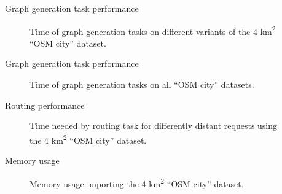\documentclass[xcolor={x11names}]{beamer}
\newenvironment{figcenter}
{%
	\parskip=0pt%
	\par%
	\nopagebreak%
	\centering%
}%
{%
	\par%
	\noindent%
	\ignorespacesafterend%
}
\begin{document}
		\begin{frame}{Graph generation task performance}
			\begin{figure}
				\begin{figcenter}
					\hspace*{-0.35cm}
					\scalebox{0.7}
					{
						
					}
				\end{figcenter}
				\caption{Time of graph generation tasks on different variants of the 4 km\textsuperscript{2} \enquote{OSM city} dataset.}
			\end{figure}
		\end{frame}
		
		\begin{frame}{Graph generation task performance}
			\begin{figure}
				\begin{figcenter}
					\hspace*{-0.35cm}
					\scalebox{0.7}
					{
						
					}
				\end{figcenter}
				\caption{Time of graph generation tasks on all \enquote{OSM city} datasets.}
			\end{figure}
		\end{frame}
		
		\begin{frame}{Routing performance}
			\begin{figure}
				\begin{figcenter}
					\hspace*{-0.35cm}
					\scalebox{0.7}
					{
						
					}
				\end{figcenter}
				\caption{Time needed by routing task for differently distant requests using the 4 km\textsuperscript{2} \enquote{OSM city} dataset.}
			\end{figure}
		\end{frame}
		
		\begin{frame}{Memory usage}
			\begin{figure}
				\begin{figcenter}
					\hspace*{-0.35cm}
					\scalebox{0.7}
					{
						
					}
				\end{figcenter}
				\caption{Memory usage importing the 4 km\textsuperscript{2} \enquote{OSM city} dataset.}
			\end{figure}
		\end{frame}
		
\end{document}
